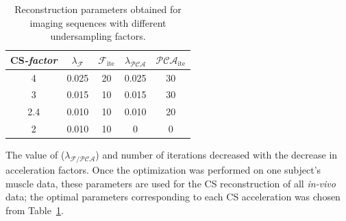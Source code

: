 \begin{table}[!htb]
\vspace{+0.2cm}
\caption[Reconstruction parameters obtained for imaging sequences with different undersampling factors]{Reconstruction parameters obtained for imaging sequences with different undersampling factors.}
\label{tab: CSS1}
\begin{center}
\begin{tabular}{@{}ccccc@{}}
\toprule[1pt]\midrule[0.3pt]
\mbox{CS\textit{-factor}} & $\lambda_{\mathcal{F}}$ & $\mathcal{F}_{\mathrm{ite}}$ & $\lambda_\mathcal{PCA}$ & $\mathcal{PCA}_{\mathrm{ite}}$ \\ \midrule
4         & 0.025  & 20   & 0.025      & 30      \\
3         & 0.015  & 10   & 0.015      & 30      \\
2.4       & 0.010  & 10   & 0.010      & 20      \\
2         & 0.010  & 10   & 0          & 0       \\ \midrule[0.3pt]\bottomrule[1pt]
\end{tabular}
\end{center}
\vspace{-0.2cm}
\end{table}
The value of ($\lambda_{\mathcal{F}/\mathcal{PCA}}$) and number of iterations decreased with the decrease in acceleration factors. 
Once the optimization was performed on one subject's muscle data, these parameters are used for the CS reconstruction of all \textit{in-vivo} data; the optimal parameters corresponding to each CS acceleration was chosen from Table~\ref{tab: CSS1}. 


